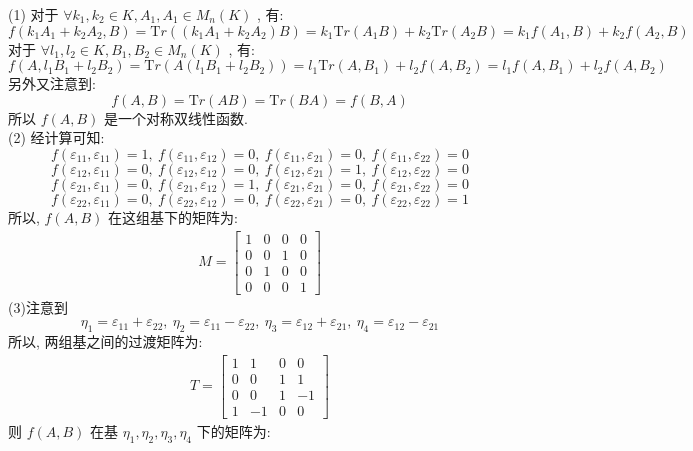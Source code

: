\documentclass[11pt,a4paper,openany,oneside]{book}
\newcommand{\Tr}{\mathrm Tr}
\begin{document}
(1) 对于 $ \forall k_1, k_2 \in K, A_1, A_1 \in M_n(K) $ , 有:
 $$  f(k_1A_1+k_2A_2, B) = \Tr((k_1A_1+k_2A_2)B) =k_1\Tr(A_1B) + k_2\Tr(A_2B) = k_1f(A_1, B) + k_2f(A_2, B)  $$ 
对于 $ \forall l_1, l_2 \in K, B_1, B_2 \in M_n(K) $ , 有:
 $$  f(A, l_1B_1 + l_2B_2) = \Tr(A(l_1B_1 + l_2B_2)) = l_1\Tr(A, B_1) + l_2f(A, B_2) = l_1f(A, B_1) + l_2f(A, B_2)  $$ 
另外又注意到:
 $$  f(A,B) = \Tr(AB) = \Tr(BA) = f(B,A)  $$ 
所以 $ f(A,B) $ 是一个对称双线性函数. \\

(2) 经计算可知:
 $$  f(\varepsilon_{11}, \varepsilon_{11}) = 1, \ f(\varepsilon_{11}, \varepsilon_{12}) = 0, \ f(\varepsilon_{11}, \varepsilon_{21}) = 0, \ f(\varepsilon_{11}, \varepsilon_{22}) = 0  $$ 
 $$  f(\varepsilon_{12}, \varepsilon_{11}) = 0, \ f(\varepsilon_{12}, \varepsilon_{12}) = 0, \ f(\varepsilon_{12}, \varepsilon_{21}) = 1, \ f(\varepsilon_{12}, \varepsilon_{22}) = 0  $$ 
 $$  f(\varepsilon_{21}, \varepsilon_{11}) = 0, \ f(\varepsilon_{21}, \varepsilon_{12}) = 1, \ f(\varepsilon_{21}, \varepsilon_{21}) = 0, \ f(\varepsilon_{21}, \varepsilon_{22}) = 0  $$ 
 $$  f(\varepsilon_{22}, \varepsilon_{11}) = 0, \ f(\varepsilon_{22}, \varepsilon_{12}) = 0, \ f(\varepsilon_{22}, \varepsilon_{21}) = 0, \ f(\varepsilon_{22}, \varepsilon_{22}) = 1  $$ 
所以,  $ f(A,B) $ 在这组基下的矩阵为:
\begin{gather*}
M = 
\begin{bmatrix}
1  &  0  &  0  &  0  \\
0  &  0  &  1  &  0  \\
0  &  1  &  0  &  0  \\
0  &  0  &  0  &  1
\end{bmatrix}
\end{gather*}
(3)注意到
 $$  \eta_1 = \varepsilon_{11} + \varepsilon_{22}, \ \eta_2 = \varepsilon_{11} - \varepsilon_{22}, \ \eta_3 = \varepsilon_{12} + \varepsilon_{21}, \ \eta_4 = \varepsilon_{12} - \varepsilon_{21}  $$ 
所以, 两组基之间的过渡矩阵为:
\begin{gather*}
T = 
\begin{bmatrix}
1  &  1  &  0  &  0 \\
0  &  0  &  1  &  1  \\
0  &  0  &  1  & -1  \\
1  & -1  &  0  &  0
\end{bmatrix}
\end{gather*}
则 $ f(A,B) $ 在基 $ \eta_1, \eta_2, \eta_3, \eta_4 $ 下的矩阵为:
\end{document}
